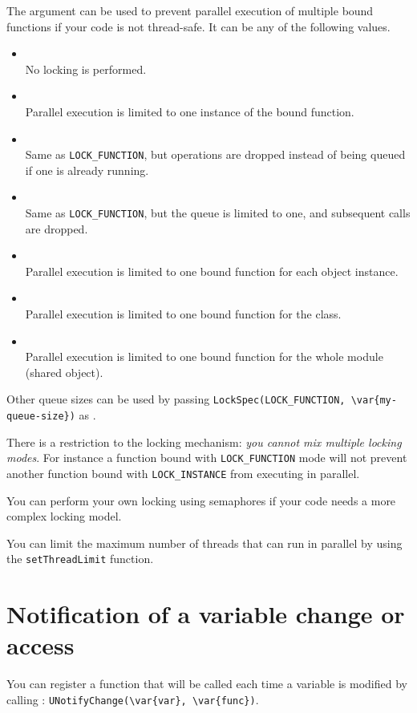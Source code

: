 The  argument can be used to prevent parallel execution of
multiple bound functions if your code is not thread-safe. It can be any of
the following values.
\begin{itemize}
\item {}\\
  No locking is performed.
\item {}\\
  Parallel execution is limited to one instance of the bound function.
\item {}\\
  Same as \lstinline{LOCK_FUNCTION}, but operations are dropped instead of
  being queued if one is already running.
\item {}\\
  Same as \lstinline{LOCK_FUNCTION}, but the queue is limited to one, and
  subsequent calls are dropped.
\item {}\\
  Parallel execution is limited to one bound function for each object
  instance.
\item {}\\
  Parallel execution is limited to one bound function for the class.
\item {}\\
  Parallel execution is limited to one bound function for the whole module
  (shared object).
\end{itemize}

Other queue sizes can be used by passing
\lstinline|LockSpec(LOCK_FUNCTION, \var{my-queue-size})| as .

There is a restriction to the locking mechanism: \emph{you cannot mix
  multiple locking modes}.  For instance a function bound with
\lstinline{LOCK_FUNCTION} mode will not prevent another function bound with
\lstinline{LOCK_INSTANCE} from executing in parallel.

You can perform your own locking using semaphores if your code needs a more
complex locking model.

You can limit the maximum number of threads that can run in parallel by using
the \lstinline{setThreadLimit} function.

\section{Notification of a variable change or access}
\label{sec:uobject:uvar-notify}
You can register a function that will be called each time a variable is
modified by calling :
\lstinline|UNotifyChange(\var{var}, \var{func})|.

